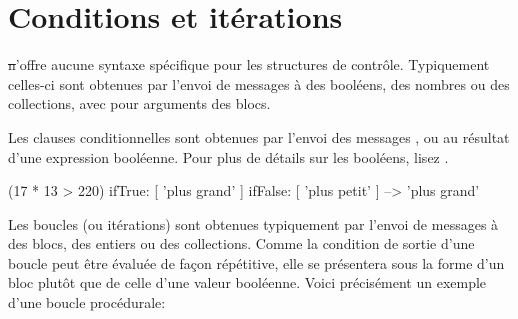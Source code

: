 \documentclass[a4paper,10pt,twoside]{book}
\begin{document}






\section{Conditions et it\'{e}rations}

\st n'offre aucune syntaxe sp\'{e}cifique pour les structures de contr\^{o}le.
Typiquement celles-ci sont obtenues par l'envoi de messages \`{a} des bool\'{e}ens, des nombres ou des collections, avec pour arguments des blocs.

Les clauses conditionnelles sont obtenues par l'envoi des messages
,  ou
 au r\'{e}sultat d'une expression
bool\'{e}enne. Pour plus de détails sur les booléens, lisez .

\begin{code}{}
(17 * 13 > 220)
   ifTrue: [ 'plus grand' ]
   ifFalse: [ 'plus petit' ] --> 'plus grand'
\end{code}

Les boucles (ou it\'{e}rations) sont obtenues typiquement par l'envoi de messages \`{a} des blocs, des entiers ou des collections.
Comme la condition de sortie d'une boucle peut \^{e}tre \'{e}valu\'{e}e de fa\c{c}on r\'{e}p\'{e}titive, elle se pr\'{e}sentera sous la forme d'un bloc plut\^{o}t que de celle d'une valeur bool\'{e}enne.
Voici pr\'{e}cis\'{e}ment un exemple d'une boucle proc\'{e}durale:
\end{document}
